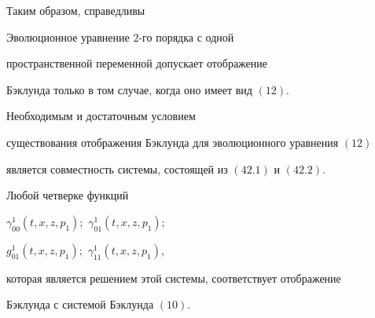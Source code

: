 Таким образом, справедливы





\begin{thms}


Эволюционное уравнение $2$-го порядка с одной


пространственной переменной допускает отображение


Бэклунда только в том случае, когда оно имеет вид $(12)$.


\end{thms}


\addtocounter{equation}{1}





\begin{thms}


Необходимым и достаточным условием


существования отображения Бэклунда для эволюционного уравнения $(12)$


является совместность системы, состоящей из $(42.1)$ и $(42.2)$.


Любой четверке функций


$\gamma_{00}^1 ({t,x,z,p_1});$ $\gamma_{01}^1 ({t,x,z,p_1});$


$g_{01}^1 ({t,x,z,p_1});$ $\gamma_{11}^1 ({t,x,z,p_1})$,


которая является решением этой системы, соответствует отображение 


Бэклунда с системой Бэклунда $(10)$.


\end{thms}





